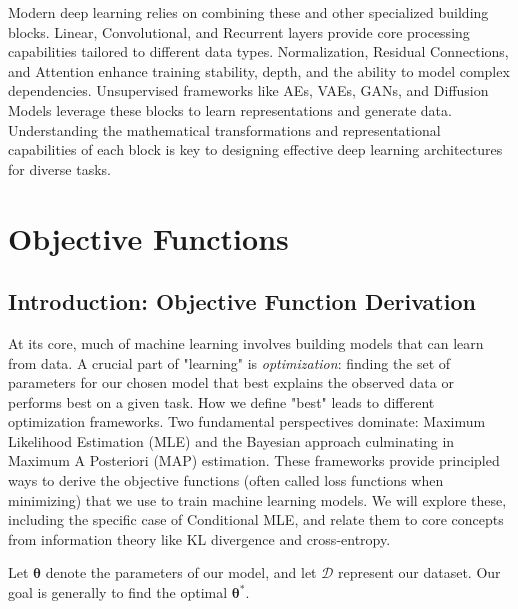 \documentclass{article}
\begin{document}
Modern deep learning relies on combining these and other specialized building blocks. Linear, Convolutional, and Recurrent layers provide core processing capabilities tailored to different data types. Normalization, Residual Connections, and Attention enhance training stability, depth, and the ability to model complex dependencies. Unsupervised frameworks like AEs, VAEs, GANs, and Diffusion Models leverage these blocks to learn representations and generate data. Understanding the mathematical transformations and representational capabilities of each block is key to designing effective deep learning architectures for diverse tasks.









\section{Objective Functions}


\subsection{Introduction: Objective Function Derivation}

At its core, much of machine learning involves building models that can learn from data. A crucial part of "learning" is \emph{optimization}: finding the set of parameters for our chosen model that best explains the observed data or performs best on a given task. How we define "best" leads to different optimization frameworks. Two fundamental perspectives dominate: Maximum Likelihood Estimation (MLE) and the Bayesian approach culminating in Maximum A Posteriori (MAP) estimation. These frameworks provide principled ways to derive the objective functions (often called loss functions when minimizing) that we use to train machine learning models. We will explore these, including the specific case of Conditional MLE, and relate them to core concepts from information theory like KL divergence and cross-entropy.

Let $\bm{\theta}$ denote the parameters of our model, and let $\mathcal{D}$ represent our dataset. Our goal is generally to find the optimal $\bm{\theta}^*$.
\end{document}
